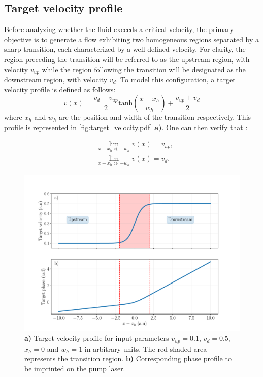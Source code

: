 \subsection{Target velocity profile}
Before analyzing whether the fluid exceeds a critical velocity, the primary objective is to generate a flow exhibiting two homogeneous regions separated by a sharp transition, each characterized by a well-defined velocity. For clarity, the region preceding the transition will be referred to as the upstream region, with velocity $v_{up}$ while the region following the transition will be designated as the downstream region, with velocity $v_{d}$.
To model this configuration, a target velocity profile is defined as follows:
\begin{equation}
    v(x)= \frac{v_{d}-v_{up}}{2}\mathrm{tanh}(\frac{x-x_h}{w_h})+\frac{v_{up}+v_{d}}{2}
    \label{eq:target_velocity}
\end{equation}
where $x_h$ and $w_h$ are the position and width of the transition respectively. This profile is represented in \autoref{fig:target_velocity.pdf} \textbf{a)}.
One can then verify that :

\begin{subequations}
    \begin{align}
    &\lim\limits_{x-x_h\ll-w_h} v(x) = v_{up},\\
    &\lim\limits_{x-x_h\gg+w_h} v(x) = v_{d}.
    \end{align}
\end{subequations}

\begin{figure}[h]
    \centering
    \includegraphics[width=1\textwidth]{chap_custom_st/fig/target_velocity.pdf}
    \caption{ \textbf{a)} Target velocity profile for input parameters $v_{up}=0.1$, $v_{d}=0.5$, $x_h=0$ and $w_h=1$ in arbitrary units. The red shaded area represents the 
    transition region. \textbf{b)} Corresponding phase profile to be imprinted on the pump laser.}
    \label{fig:target_velocity.pdf}
\end{figure}

